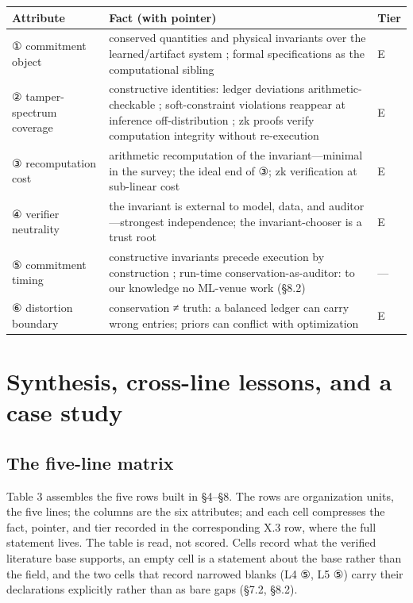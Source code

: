 \documentclass[11pt,a4paper]{article}
\begin{document}
\begin{table}[htbp]
\centering
\footnotesize
\setlength{\tabcolsep}{3.5pt}
\renewcommand{\arraystretch}{1.18}
\begin{tabularx}{0.985\textwidth}{>{\raggedright\arraybackslash}p{} >{\raggedright\arraybackslash}X >{\raggedright\arraybackslash}p{}}
\toprule
\textbf{Attribute} & \textbf{Fact (with pointer)} & \textbf{Tier} \\
\midrule
① commitment object & conserved quantities and physical invariants over the learned\slash artifact system \cite{key11,key12,key13}; formal specifications as the computational sibling \cite{key52,key53,key54} & E \\
② tamper-spectrum coverage & constructive identities: ledger deviations arithmetic-checkable \cite{key11}; soft-constraint violations reappear at inference off-distribution \cite{key12,key13}; zk proofs verify computation integrity without re-execution \cite{key53} & E \\
③ recomputation cost & arithmetic recomputation of the invariant—minimal in the survey; the ideal end of ③; zk verification at sub-linear cost \cite{key53} & E \\
④ verifier neutrality & the invariant is external to model, data, and auditor—strongest independence; the invariant-chooser is a trust root \cite{key11,key12,key13} & E \\
⑤ commitment timing & constructive invariants precede execution by construction \cite{key11}; run-time conservation-as-auditor: to our knowledge no ML-venue work (§8.2) & — \\
⑥ distortion boundary & conservation ≠ truth: a balanced ledger can carry wrong entries; priors can conflict with optimization \cite{key13} & E \\
\bottomrule
\end{tabularx}
\end{table}

\section{Synthesis, cross-line lessons, and a case study}

\subsection{The five-line matrix}

Table 3 assembles the five rows built in §4–§8. The rows are organization units, the five lines; the columns are the six attributes; and each cell compresses the fact, pointer, and tier recorded in the corresponding X.3 row, where the full statement lives. The table is read, not scored. Cells record what the verified literature base supports, an empty cell is a statement about the base rather than the field, and the two cells that record narrowed blanks (L4 ⑤, L5 ⑤) carry their declarations explicitly rather than as bare gaps (§7.2, §8.2).
\end{document}
